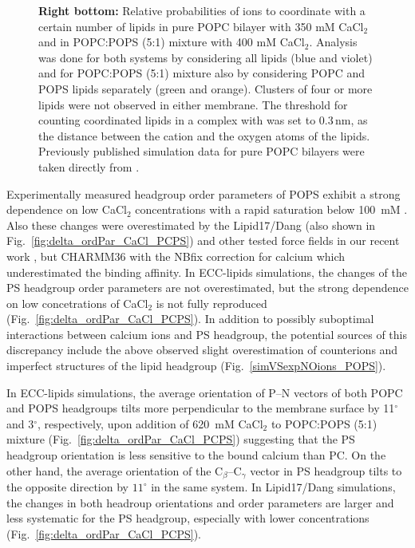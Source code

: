 \documentclass[journal=jpcbfk,manuscript=article]{achemso}
\begin{document}
\begin{figure}[tbp!]
{    \textbf{Right bottom:} Relative probabilities of  ions to coordinate with a certain number of lipids
    in pure POPC bilayer with 350 mM CaCl$_2$ and in POPC:POPS (5:1) mixture with 400 mM CaCl$_2$.  
    Analysis was done for both systems by considering all lipids (blue and violet) and
    for POPC:POPS (5:1) mixture also by considering POPC and POPS lipids separately (green and orange). 
    Clusters of four or more lipids were not observed in either membrane.
    The threshold for counting coordinated lipids in a complex with  was set to $0.3\,\mathrm{nm}$, 
    as the distance between the cation and the oxygen atoms of the lipids. 
    Previously published simulation data \cite{melcr18} for pure POPC bilayers were taken directly from \cite{ECC-POPC_nacl_cacl2_files}. 
  }
\end{figure} 


Experimentally measured headgroup order parameters of POPS exhibit a strong dependence
on low CaCl$_2$ concentrations with a rapid saturation below 100~mM \cite{roux90}.
Also these changes were overestimated by the Lipid17/Dang (also shown in Fig.~\ref{fig:delta_ordPar_CaCl_PCPS})
and other tested force fields in our recent work \cite{NMRlipidsIV}, 
but CHARMM36 with the NBfix correction for calcium
which underestimated the binding affinity.
In ECC-lipids simulations, the changes of the PS headgroup order parameters are not overestimated,
but the strong dependence on low concetrations of CaCl$_2$ is not fully reproduced (Fig.~\ref{fig:delta_ordPar_CaCl_PCPS}).
In addition to possibly suboptimal interactions between calcium ions and PS headgroup, the potential sources of this
discrepancy include the above observed slight overestimation of  counterions and
imperfect structures of the lipid headgroup (Fig.~\ref{simVSexpNOions_POPS}).


In ECC-lipids simulations, the average orientation of P--N vectors of both POPC and POPS headgroups tilts more perpendicular to the membrane surface
by 11$^\circ$ and  3$^\circ$, respectively, upon addition of 620~mM CaCl$_2$ to POPC:POPS (5:1) mixture (Fig.~\ref{fig:delta_ordPar_CaCl_PCPS})
suggesting that the PS headgroup orientation is less sensitive to the bound calcium than PC.
On the other hand, the average orientation of the C$_{\beta}$--C$_{\gamma}$ vector in PS headgroup
tilts to the opposite direction by $11^\circ$ in the same system.
In Lipid17/Dang simulations, the changes in both headroup orientations and order parameters
are larger and less systematic for the PS headgroup, especially with lower concentrations (Fig.~\ref{fig:delta_ordPar_CaCl_PCPS}).
\end{document}
